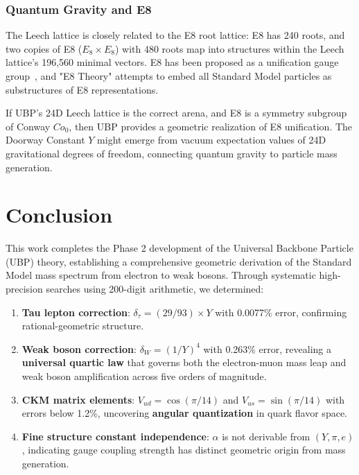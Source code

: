\documentclass[11pt,a4paper]{article}
\begin{document}
\subsubsection{Quantum Gravity and E8}

The Leech lattice is closely related to the E8 root lattice: E8 has 240 roots, and two copies of E8 ($E_8 \times E_8$) with 480 roots map into structures within the Leech lattice's 196{,}560 minimal vectors. E8 has been proposed as a unification gauge group~\cite{ref004}, and "E8 Theory" attempts to embed all Standard Model particles as substructures of E8 representations.

If UBP's 24D Leech lattice is the correct arena, and E8 is a symmetry subgroup of Conway $Co_0$, then UBP provides a geometric realization of E8 unification. The Doorway Constant $Y$ might emerge from vacuum expectation values of 24D gravitational degrees of freedom, connecting quantum gravity to particle mass generation.

\section{Conclusion}

This work completes the Phase 2 development of the Universal Backbone Particle (UBP) theory, establishing a comprehensive geometric derivation of the Standard Model mass spectrum from electron to weak bosons. Through systematic high-precision searches using 200-digit arithmetic, we determined:

\begin{enumerate}
\item \textbf{Tau lepton correction}: $\delta_\tau = (29/93) \times Y$ with 0.0077\% error, confirming rational-geometric structure.

\item \textbf{Weak boson correction}: $\delta_W = (1/Y)^4$ with 0.263\% error, revealing a \textbf{universal quartic law} that governs both the electron-muon mass leap and weak boson amplification across five orders of magnitude.

\item \textbf{CKM matrix elements}: $V_{ud} = \cos(\pi/14)$ and $V_{us} = \sin(\pi/14)$ with errors below 1.2\%, uncovering \textbf{angular quantization} in quark flavor space.

\item \textbf{Fine structure constant independence}: $\alpha$ is not derivable from $(Y, \pi, e)$, indicating gauge coupling strength has distinct geometric origin from mass generation.
\end{enumerate}
\end{document}
